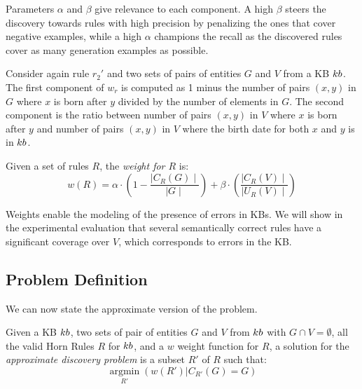 Parameters $\alpha$ and $\beta$ give relevance to each component. A high $\beta$ steers the discovery towards rules with high precision by penalizing the ones that cover negative examples, %
while a high $\alpha$ champions the recall as the discovered rules cover as many generation examples as possible.

\begin{example}
	Consider again rule $r_2'$ %
	and two sets of pairs of entities $G$ and $V$ from a KB ${\sc kb}$. 
The first component of $w_r$ is computed as 1 minus the number of pairs $(x,y)$ in $G$ where
		$x$ is born after $y$ divided by the number of elements in $G$.
The second component is the ratio between number of pairs $(x,y)$ in $V$ where $x$ is born after $y$ and number of pairs $(x,y)$ in $V$ where the birth date for both $x$ and $y$ is in ${\sc kb}$.
\end{example}

\begin{definition}
\label{def:totCost}
	Given a set of rules $R$, the {\em weight for $R$} is:
	\begin{equation*}
		w(R) = \alpha \cdot (1-\frac{\mid C_{R}(G)\mid}{\mid G \mid}) +\beta \cdot (\frac{\mid C_{R}(V) \mid}{\mid U_{R}(V)\mid})
	\end{equation*}
\end{definition}

Weights enable the modeling of the presence of errors in KBs. We will show in the experimental evaluation that several semantically correct rules have a significant coverage over $V$, which corresponds to errors in the KB. 

\vspace{-1ex}	
\subsection{Problem Definition} \label{sec:krd_prob_def}
\vspace{-1ex}	
We can now state the approximate version of the problem.

\begin{definition}
	Given a KB ${\sc kb}$, two sets of pair of entities $G$ and $V$ from ${\sc kb}$ with $G \cap V = \emptyset$, all the valid Horn Rules $R$ for ${\sc kb}$, and a $w$ weight function for $R$, a solution for the \emph{approximate discovery problem} is a subset $R'$ of $R$  such that:
%
	$$\underset{R'}{\operatorname{argmin}}(w(R') | C_{R'}(G) = G)$$
\end{definition}
\vspace{-1ex}	

